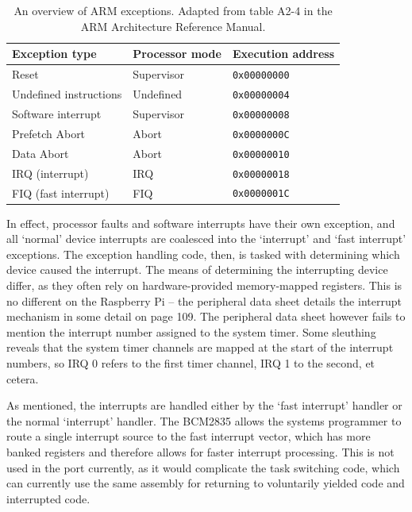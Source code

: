 \documentclass[twoside]{uva-inf-bachelor-thesis}
\begin{document}
\begin{table}[h]
    \centering
    \begin{tabular}{lll}
        \toprule
        \textbf{Exception type} & \textbf{Processor mode} & \textbf{Execution address} \\
        \midrule
        Reset & Supervisor & \texttt{0x00000000} \\
        Undefined instructions & Undefined & \texttt{0x00000004} \\
        Software interrupt & Supervisor & \texttt{0x00000008} \\
        Prefetch Abort & Abort & \texttt{0x0000000C} \\
        Data Abort & Abort & \texttt{0x00000010} \\
        IRQ (interrupt) & IRQ & \texttt{0x00000018} \\
        FIQ (fast interrupt) & FIQ & \texttt{0x0000001C} \\
        \bottomrule
    \end{tabular}
    \caption{An overview of ARM exceptions. Adapted from table A2-4 in the ARM Architecture Reference Manual\cite{arm:arm}.}
    \label{tbl:exceptions}
\end{table}

In effect, processor faults and software interrupts have their own exception, and all `normal' device interrupts are coalesced into the `interrupt' and `fast interrupt' exceptions. The exception handling code, then, is tasked with determining which device caused the interrupt. The means of determining the interrupting device differ, as they often rely on hardware-provided memory-mapped registers. This is no different on the Raspberry Pi -- the peripheral data sheet details the interrupt mechanism in some detail on page 109. The peripheral data sheet however fails to mention the interrupt number assigned to the system timer. Some sleuthing reveals that the system timer channels are mapped at the start of the interrupt numbers, so IRQ 0 refers to the first timer channel, IRQ 1 to the second, et cetera.

As mentioned, the interrupts are handled either by the `fast interrupt' handler or the normal `interrupt' handler. The BCM2835 allows the systems programmer to route a single interrupt source to the fast interrupt vector, which has more banked registers and therefore allows for faster interrupt processing. This is not used in the port currently, as it would complicate the task switching code, which can currently use the same assembly for returning to voluntarily yielded code and interrupted code.
\end{document}
